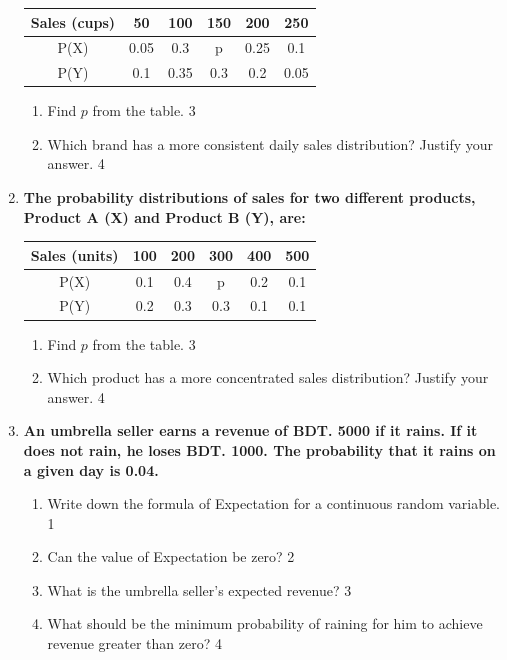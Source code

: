 \documentclass[a4paper,oneside]{book}
\begin{document}
\begin{enumerate}
	    \begin{table}[h]
	    	  \begin{center}
\begin{tabular}{c|c|c|c|c|c}
Sales (cups) & 50   & 100  & 150  & 200  & 250  \\ \hline
P(X)         & 0.05 & 0.3  & p    & 0.25 & 0.1  \\ \hline
P(Y)         & 0.1  & 0.35 & 0.3  & 0.2  & 0.05
\end{tabular}
	  \end{center}
\end{table}
  
  \begin{enumerate}
       \item  
	Find \( p \) from the table. \hfill 3
    \item
	Which brand has a more consistent daily sales distribution? Justify your answer. \hfill 4
  \end{enumerate}
  

\item
\textbf{The probability distributions of sales for two different products, Product A (X) and Product B (Y), are:} 

\begin{table}[H]
\begin{center}
\begin{tabular}{c|c|c|c|c|c}
Sales (units) & 100  & 200  & 300  & 400  & 500  \\ \hline
P(X)          & 0.1  & 0.4  & p    & 0.2  & 0.1  \\ \hline
P(Y)          & 0.2  & 0.3  & 0.3  & 0.1  & 0.1
\end{tabular}
\end{center}
\end{table}

\begin{enumerate}
    \item
    Find \( p \) from the table. \hfill 3

    \item
    Which product has a more concentrated sales distribution? Justify your answer. \hfill 4
\end{enumerate}

\item
	  \textbf{An umbrella seller earns a revenue of BDT. 5000 if it rains. If it does not rain, he loses BDT. 1000. The probability that it rains on a given day is 0.04.} 
  
  \begin{enumerate}
    \item
	Write down the formula of Expectation for a continuous random variable. \hfill 1
    \item
	Can the value of Expectation be zero? \hfill 2
    \item  
	What is the umbrella seller's expected revenue? \hfill 3
    \item
	What should be the minimum probability of raining for him to achieve revenue greater than zero? \hfill 4
  \end{enumerate}
  

\end{enumerate}
\end{document}

